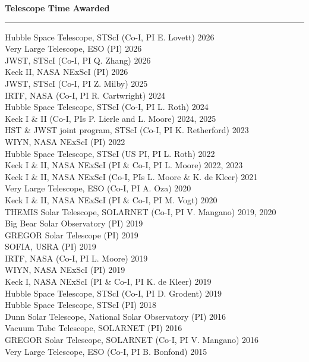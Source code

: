 \documentclass[12pt]{report}
\begin{document}
\noindent\bf{Telescope Time Awarded}\rm \hspace*{\fill} \\
\rule{\textwidth}{1pt}
Hubble Space Telescope, STScI (Co-I, PI E. Lovett) \hfill 2026\\
Very Large Telescope, ESO (PI) \hfill 2026\\
JWST, STScI (Co-I, PI Q. Zhang) \hfill 2026\\
Keck II, NASA NExScI (PI) \hfill 2026\\
JWST, STScI (Co-I, PI Z. Milby) \hfill 2025\\
IRTF, NASA (Co-I, PI R. Cartwright) \hfill 2024\\
Hubble Space Telescope, STScI (Co-I, PI L. Roth) \hfill 2024\\
Keck I \& II (Co-I, PIs P. Lierle and L. Moore) \hfill 2024, 2025\\
HST \& JWST joint program, STScI (Co-I, PI K. Retherford) \hfill 2023\\
WIYN, NASA NExScI (PI) \hfill 2022\\
Hubble Space Telescope, STScI (US PI, PI L. Roth) \hfill 2022\\
Keck I \& II, NASA NExScI (PI \& Co-I, PI L. Moore) \hfill 2022, 2023\\
Keck I \& II, NASA NExScI (Co-I, PIs L. Moore \& K. de Kleer) \hfill 2021\\
Very Large Telescope, ESO (Co-I, PI A. Oza) \hfill 2020\\
Keck I \& II, NASA NExScI  (PI \& Co-I, PI M. Vogt) \hfill 2020\\
THEMIS Solar Telescope, SOLARNET (Co-I, PI V. Mangano) \hfill 2019, 2020\\
Big Bear Solar Observatory (PI) \hfill 2019\\
GREGOR Solar Telescope (PI) \hfill 2019\\
SOFIA, USRA (PI) \hfill 2019\\
IRTF, NASA (Co-I, PI L. Moore) \hfill 2019\\
WIYN, NASA NExScI (PI) \hfill 2019\\
Keck I, NASA NExScI (PI \& Co-I, PI K. de Kleer) \hfill 2019\\
Hubble Space Telescope, STScI (Co-I, PI D. Grodent) \hfill 2019\\
Hubble Space Telescope, STScI (PI) \hfill 2018\\
Dunn Solar Telescope, National Solar Observatory (PI) \hfill 2016\\
Vacuum Tube Telescope, SOLARNET (PI) \hfill 2016\\
GREGOR Solar Telescope, SOLARNET (Co-I, PI V. Mangano) \hfill 2016\\
Very Large Telescope, ESO (Co-I, PI B. Bonfond) \hfill 2015\\
\end{document}
